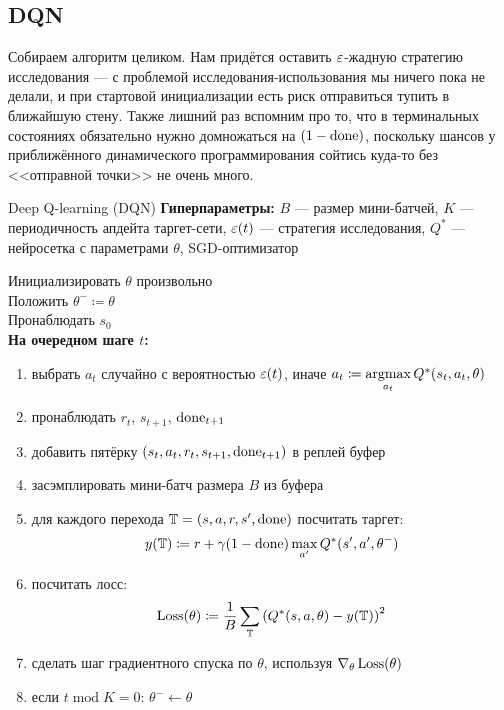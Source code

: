 \subsection{DQN}

Собираем алгоритм целиком. Нам придётся оставить $\varepsilon$-жадную стратегию исследования --- с проблемой исследования-использования мы ничего пока не делали, и при стартовой инициализации есть риск отправиться тупить в ближайшую стену. Также лишний раз вспомним про то, что в терминальных состояниях обязательно нужно домножаться на $(1 - \mathrm{done})$, поскольку шансов у приближённого динамического программирования сойтись куда-то без <<отправной точки>> не очень много. 

\begin{algorithm}[label = DQNalgorithm]{Deep Q-learning (DQN)}
\textbf{Гиперпараметры:} $B$ --- размер мини-батчей, $K$ --- периодичность апдейта таргет-сети, $\varepsilon(t)$ --- стратегия исследования, $Q^*$ --- нейросетка с параметрами $\theta$, SGD-оптимизатор

\vspace{0.3cm}
Инициализировать $\theta$ произвольно \\
Положить $\theta^- \coloneqq \theta$ \\
Пронаблюдать $s_0$ \\
\textbf{На очередном шаге $t$:}
\begin{enumerate}
    \item выбрать $a_t$ случайно с вероятностью $\varepsilon(t)$, иначе $a_t \coloneqq \mathop{\mathrm{argmax}}\limits_{a_t} Q^*(s_t, a_t, \theta)$
    \item пронаблюдать $r_t$,  $s_{t+1}$, $\mathrm{done}_{t+1}$
    \item добавить пятёрку $(s_t, a_t, r_t, s_{t+1}, \mathrm{done}_{t+1})$ в реплей буфер
    \item засэмплировать мини-батч размера $B$ из буфера
    \item для каждого перехода $\mathbb{T} = (s, a, r, s', \mathrm{done})$ посчитать таргет:
    $$y(\mathbb{T} ) \coloneqq r + \gamma (1 - \mathrm{done}) \max\limits_{a'} Q^*(s', a', \theta^-)$$
    \item посчитать лосс:
    $$\operatorname{Loss}(\theta) \coloneqq \frac{1}{B}\sum_{\mathbb{T}} \left( Q^*(s, a, \theta) - y(\mathbb{T} ) \right) ^2$$
    \item сделать шаг градиентного спуска по $\theta$, используя $\nabla_\theta \operatorname{Loss}(\theta)$
    \item если $t \operatorname{mod} K = 0$: $\theta^- \gets \theta$
\end{enumerate}
\end{algorithm}